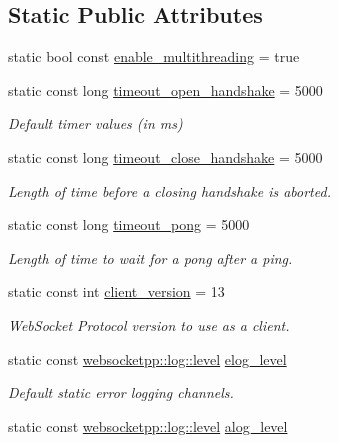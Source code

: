 \subsection*{Static Public Attributes}
\begin{DoxyCompactItemize}
\item 
static bool const \hyperlink{structwebsocketpp_1_1config_1_1core_ad3ed5fc89c7a79e7c2c5193f640d87ba}{enable\+\_\+multithreading} = true
\item 
static const long \hyperlink{structwebsocketpp_1_1config_1_1core_a48b8736d5603bf1b629c1aff75939515}{timeout\+\_\+open\+\_\+handshake} = 5000
\begin{DoxyCompactList}\small\item\em Default timer values (in ms) \end{DoxyCompactList}\item 
static const long \hyperlink{structwebsocketpp_1_1config_1_1core_aa1a2e4285f1521817e374c4135660020}{timeout\+\_\+close\+\_\+handshake} = 5000
\begin{DoxyCompactList}\small\item\em Length of time before a closing handshake is aborted. \end{DoxyCompactList}\item 
static const long \hyperlink{structwebsocketpp_1_1config_1_1core_ac92c4ded9c804e2d0280f400fb51600d}{timeout\+\_\+pong} = 5000
\begin{DoxyCompactList}\small\item\em Length of time to wait for a pong after a ping. \end{DoxyCompactList}\item 
static const int \hyperlink{structwebsocketpp_1_1config_1_1core_af3b087e00d7793c8ae291566f8988375}{client\+\_\+version} = 13
\begin{DoxyCompactList}\small\item\em Web\+Socket Protocol version to use as a client. \end{DoxyCompactList}\item 
static const \hyperlink{namespacewebsocketpp_1_1log_a12d4d17939f102db8c9183d400a41960}{websocketpp\+::log\+::level} \hyperlink{structwebsocketpp_1_1config_1_1core_a31a33f2fdcf9cabf04995367ce473c77}{elog\+\_\+level}
\begin{DoxyCompactList}\small\item\em Default static error logging channels. \end{DoxyCompactList}\item 
static const \hyperlink{namespacewebsocketpp_1_1log_a12d4d17939f102db8c9183d400a41960}{websocketpp\+::log\+::level} \hyperlink{structwebsocketpp_1_1config_1_1core_abcefa380ef3c250f919ae6a44a9b5724}{alog\+\_\+level}

\end{DoxyCompactItemize}
